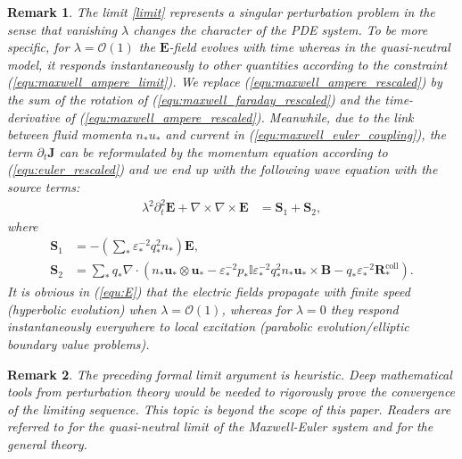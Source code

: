 \documentclass{article}
\newtheorem*{remark}{Remark}
\begin{document}
\begin{remark}
  \label{rem:limit}
  The limit \eqref{limit} represents a \emph{singular perturbation problem} in the sense
  that vanishing $\lambda$ changes the character of the PDE system. To be more specific,
  for $\lambda = \mathcal{O}(1)$ the $\mathbf{E}$-field evolves with time whereas in the
  quasi-neutral model, it responds instantaneously to other quantities according to the
  constraint (\ref{equ:maxwell_ampere_limit}). We replace
  (\ref{equ:maxwell_ampere_rescaled}) by the sum of the rotation of
  (\ref{equ:maxwell_faraday_rescaled}) and the time-derivative of
  (\ref{equ:maxwell_ampere_rescaled}). Meanwhile, due to the link between fluid momenta
  $n_*u_*$ and current in (\ref{equ:maxwell_euler_coupling}), the term
  $\partial_t\mathbf{J}$ can be reformulated by the momentum equation according to
  (\ref{equ:euler_rescaled}) and we end up with the following wave equation with the source
  terms:
  \begin{align}
    \lambda^2\partial_t^2 \mathbf{E} + \nabla \times \nabla \times \mathbf{E} &= \mathbf{S}_1 + \mathbf{S}_2, \label{equ:E}
  \end{align}
  where
  \begin{align}
    \mathbf{S}_1 &= - \left(\sum_*\varepsilon_*^{-2}q_*^2n_*\right)\mathbf{E}, \\
    \mathbf{S}_2 &= \sum_* q_*\nabla\cdot(n_* \mathbf{u}_* \otimes \mathbf{u}_*
    - \varepsilon_*^{-2}p_*\mathbb{I}\varepsilon_*^{-2}q_*^2n_*\mathbf{u}_*\times\mathbf{B}
    - q_*\varepsilon_*^{-2}\mathbf{R}^\text{coll}_*).
  \end{align}
  It is obvious in (\ref{equ:E}) that the electric fields propagate with finite speed
  (hyperbolic evolution) when $\lambda = \mathcal{O}(1)$, whereas for $\lambda = 0$ they
  respond instantaneously everywhere to local excitation (parabolic evolution/elliptic
  boundary value problems).
\end{remark}

\begin{remark}
  The preceding formal limit argument is heuristic. Deep mathematical tools from
  perturbation theory would be needed to rigorously prove the convergence of the limiting
  sequence. This topic is beyond the scope of this paper. Readers are referred to
  \cite[Ch. 2]{remi_2014} \cite{Peng_2008} for the quasi-neutral limit of the
  Maxwell-Euler system and \cite{mark_1995, Eckhaus_1980} for the general theory.
\end{remark} 
\end{document}
